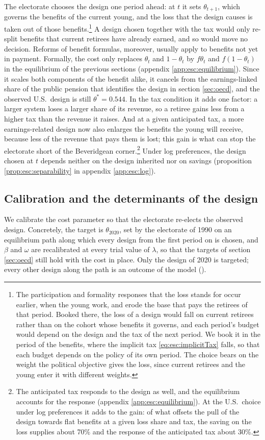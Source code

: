 The electorate chooses the design one period ahead: at $t$ it sets $\theta_{t+1}$, which governs the benefits of the current young, and the loss that the design causes is taken out of those benefits.\footnote{The participation and formality responses that the loss stands for occur earlier, when the young work, and erode the base that pays the retirees of that period. Booked there, the loss of a design would fall on current retirees rather than on the cohort whose benefits it governs, and each period's budget would depend on the design and the tax of the next period. We book it in the period of the benefits, where the implicit tax \eqref{eq:esc:implicitTax} falls, so that each budget depends on the policy of its own period. The choice bears on the weight the political objective gives the loss, since current retirees and the young enter it with different weights.} A design chosen together with the tax would only re-split benefits that current retirees have already earned, and so would move no decision. Reforms of benefit formulas, moreover, usually apply to benefits not yet in payment. Formally, the cost only replaces $\theta_t$ and $1-\theta_t$ by $f\theta_t$ and $f(1-\theta_t)$ in the equilibrium of the previous sections (appendix \ref{app:esc:equilibrium}). Since it scales both components of the benefit alike, it cancels from the earnings-linked share of the public pension that identifies the design in section \ref{sec:oecd}, and the observed U.S.\ design is still $\theta^{\ast} = 0.544$. In the tax condition it adds one factor: a larger system loses a larger share of its revenue, so a retiree gains less from a higher tax than the revenue it raises. And at a given anticipated tax, a more earnings-related design now also enlarges the benefits the young will receive, because less of the revenue that pays them is lost; this gain is what can stop the electorate short of the Beveridgean corner.\footnote{The anticipated tax responds to the design as well, and the equilibrium accounts for the response (appendix \ref{app:esc:equilibrium}). At the U.S.\ choice under log preferences it adds to the gain: of what offsets the pull of the design towards flat benefits at a given loss share and tax, the saving on the loss supplies about 70\% and the response of the anticipated tax about 30\%.} Under log preferences, the design chosen at $t$ depends neither on the design inherited nor on savings (proposition \ref{prop:esc:separability} in appendix \ref{app:esc:log}).

\subsection{Calibration and the determinants of the design}\label{sec:esc:calibration}\label{sec:esc:results}
We calibrate the cost parameter so that the electorate re-elects the observed design. Concretely, the target is $\theta_{2020}$, set by the electorate of 1990 on an equilibrium path along which every design from the first period on is chosen, and $\beta$ and $\omega$ are recalibrated at every trial value of $\lambda$, so that the targets of section \ref{sec:oecd} still hold with the cost in place. Only the design of 2020 is targeted; every other design along the path is an outcome of the model ().

